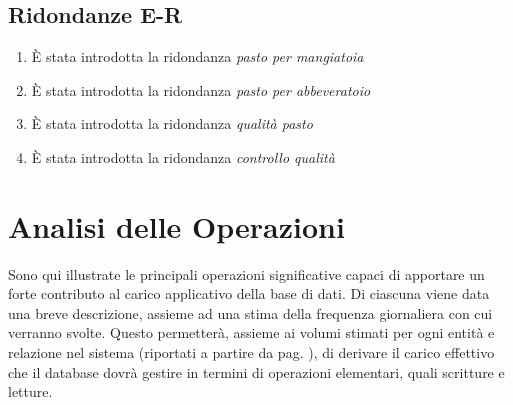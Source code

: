 \documentclass[12pt,a4paper]{article}
\begin{document}
\subsection{Ridondanze E-R}
\label{subsec:ridondanze-ent-rel}

\begin{enumerate}

\item \`E stata introdotta la ridondanza \textit{pasto per mangiatoia}
\item \`E stata introdotta la ridondanza \textit{pasto per abbeveratoio}
\item \`E stata introdotta la ridondanza \textit{qualità pasto}
\item \`E stata introdotta la ridondanza \textit{controllo qualità}

\end{enumerate}

\newpage
\section{Analisi delle Operazioni}
\label{sec:operazioni}
Sono qui illustrate le principali operazioni significative capaci di apportare un forte contributo al carico applicativo della base di dati.
Di ciascuna viene data una breve descrizione, assieme ad una stima della frequenza giornaliera con cui verranno svolte.
Questo permetterà, assieme ai volumi stimati per ogni entità e relazione nel sistema (riportati a partire da pag. \pageref{sec:volumi}), di derivare il carico effettivo che il database dovrà gestire in termini di operazioni elementari, quali scritture e letture.
\end{document}
